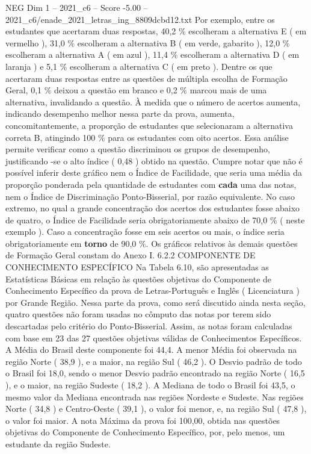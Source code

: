\begin{textsample}{NEG Dim 1 – 2021\_c6 – Score -5.00 – 2021\_c6/enade\_2021\_letras\_ing\_8809dcbd12.txt}
Por exemplo, entre os estudantes que acertaram duas respostas, 40,2 \% escolheram a alternativa E ( em vermelho ), 31,0 \% escolheram a alternativa B ( em verde, gabarito ), 12,0 \% escolheram a alternativa A ( em azul ), 11,4 \% escolheram a alternativa D ( em laranja ) e 5,1 \% escolheram a alternativa C ( em preto ).
Dentre os que acertaram duas respostas entre as questões de múltipla escolha de Formação Geral, 0,1 \% deixou a questão em branco e 0,2 \% marcou mais de uma alternativa, invalidando a questão.
À medida que o número de acertos aumenta, indicando desempenho melhor nessa parte da prova, aumenta, concomitantemente, a proporção de estudantes que selecionaram a alternativa correta B, atingindo 100 \% para os estudantes com oito acertos.
Essa análise permite verificar como a questão discriminou os grupos de desempenho, justificando -se o alto índice ( 0,48 ) obtido na questão.
Cumpre notar que não é possível inferir deste gráfico nem o Índice de Facilidade, que seria uma média da proporção ponderada pela quantidade de estudantes com \textbf{cada} uma das notas, nem o Índice de Discriminação Ponto-Bisserial, por razão equivalente.
No caso extremo, no qual a grande concentração dos acertos dos estudantes fosse abaixo de quatro, o Índice de Facilidade seria obrigatoriamente abaixo de 70,0 \% ( neste exemplo ).
Caso a concentração fosse em seis acertos ou mais, o índice seria obrigatoriamente em \textbf{torno} de 90,0 \%.
Os gráficos relativos às demais questões de Formação Geral constam do Anexo I. 6.2.2 COMPONENTE DE CONHECIMENTO ESPECÍFICO Na Tabela 6.10, são apresentadas as Estatísticas Básicas em relação às questões objetivas do Componente de Conhecimento Específico da prova de Letras-Português e Inglês ( Licenciatura ) por Grande Região.
Nessa parte da prova, como será discutido ainda nesta seção, quatro questões não foram usadas no cômputo das notas por terem sido descartadas pelo critério do Ponto-Bisserial.
Assim, as notas foram calculadas com base em 23 das 27 questões objetivas válidas de Conhecimentos Específicos.
A Média do Brasil deste componente foi 44,4.
A menor Média foi observada na região Norte ( 38,9 ), e a maior, na região Sul ( 46,2 ).
O Desvio padrão de todo o Brasil foi 18,0, sendo o menor Desvio padrão encontrado na região Norte ( 16,5 ), e o maior, na região Sudeste ( 18,2 ).
A Mediana de todo o Brasil foi 43,5, o mesmo valor da Mediana encontrada nas regiões Nordeste e Sudeste.
Nas regiões Norte ( 34,8 ) e Centro-Oeste ( 39,1 ), o valor foi menor, e, na região Sul ( 47,8 ), o valor foi maior.
A nota Máxima da prova foi 100,00, obtida nas questões objetivas do Componente de Conhecimento Específico, por, pelo menos, um estudante da região Sudeste.

\end{textsample}
